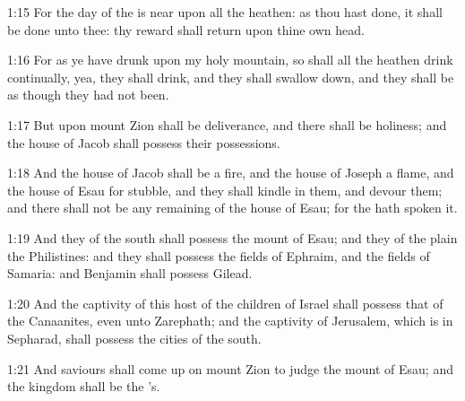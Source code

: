 1:15 For the day of the \LORD is near upon all the heathen: as thou hast done, it shall be done unto thee: thy reward shall return upon thine own head.

1:16 For as ye have drunk upon my holy mountain, so shall all the heathen drink continually, yea, they shall drink, and they shall swallow down, and they shall be as though they had not been.

1:17 But upon mount Zion shall be deliverance, and there shall be holiness; and the house of Jacob shall possess their possessions.

1:18 And the house of Jacob shall be a fire, and the house of Joseph a flame, and the house of Esau for stubble, and they shall kindle in them, and devour them; and there shall not be any remaining of the house of Esau; for the \LORD hath spoken it.

1:19 And they of the south shall possess the mount of Esau; and they of the plain the Philistines: and they shall possess the fields of Ephraim, and the fields of Samaria: and Benjamin shall possess Gilead.

1:20 And the captivity of this host of the children of Israel shall possess that of the Canaanites, even unto Zarephath; and the captivity of Jerusalem, which is in Sepharad, shall possess the cities of the south.

1:21 And saviours shall come up on mount Zion to judge the mount of Esau; and the kingdom shall be the \LORD's.

